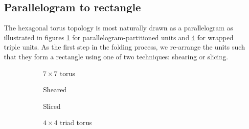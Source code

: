 		\subsection{Parallelogram to rectangle}
			
			The hexagonal torus topology is most naturally drawn as a parallelogram
			as illustrated in figures \ref{fig:hex-to-plane-node-native} for
			parallelogram-partitioned units and \ref{fig:hex-to-plane-native} for
			wrapped triple units. As the first step in the folding process, we
			re-arrange the units such that they form a rectangle using one of two
			techniques: shearing or slicing.
			
			\begin{figure}
				\center
				\begin{subfigure}[b]{0.32\linewidth}
					\center
					
					\caption{$7 \times 7$ torus}
					\label{fig:hex-to-plane-node-native}
				\end{subfigure}
				\begin{subfigure}[b]{0.32\linewidth}
					\center
					
					\caption{Sheared}
					\label{fig:hex-to-plane-node-shear}
				\end{subfigure}
				\begin{subfigure}[b]{0.32\linewidth}
					\center
					
					\caption{Sliced}
					\label{fig:hex-to-plane-node-slice}
				\end{subfigure}
				
				\caption{Transformations of hexagonal toruses into a rectangular form.
				Thin lines show wrap-around links. Pointy-topped hexagons represent
				units of individual nodes or parallelogram partitioned groups of
				nodes.}
				\label{fig:hex-to-plane-node}
				
				
				
				\center
				\begin{subfigure}[b]{0.32\linewidth}
					\center
					
					\caption{$4 \times 4$ triad torus}
					\label{fig:hex-to-plane-native}
				\end{subfigure}
				\begin{subfigure}[b]{0.32\linewidth}
					\center
					

\end{subfigure}
\end{figure}
